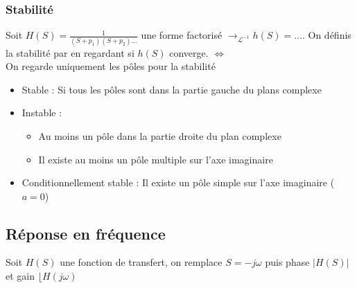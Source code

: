 \documentclass{article}
\theoremstyle{plain}%
\theoremstyle{definition}
\theoremstyle{remark}
\begin{document}
\subsubsection{Stabilité}
Soit $ H(S) = \frac{1}{(S+p_1)(S+p_2)\dots} $ une forme factorisé $ \to_{\mathcal{L}^{-1}} h(S)=\dots$. On définis la stabilité par en regardant si $ h(S) $ converge. $ \Leftrightarrow $ \\
On regarde uniquement les pôles pour la stabilité 
\begin{itemize}
    \item Stable : Si tous les pôles sont dans la partie gauche du plans complexe
    \item Instable : \begin{itemize}
        \item Au moins un pôle dans la partie droite du plan complexe
        \item Il existe au moins un pôle multiple sur l'axe imaginaire
    \end{itemize}
    \item Conditionnellement stable : Il existe un pôle simple sur l'axe imaginaire ($a=0$)
\end{itemize}


\subsection{Réponse en fréquence}
Soit $ H(S) $ une fonction de transfert, on remplace $ S = -j \omega $ puis phase $ \left| H(S) \right|  $ et gain $ \lfloor H(j \omega ) $ 
\end{document}
